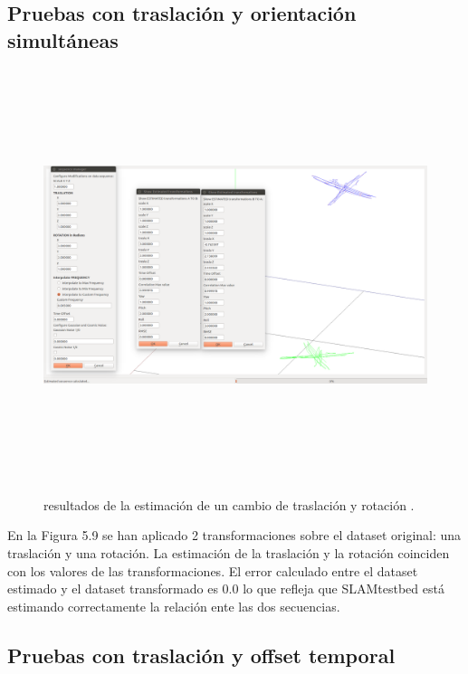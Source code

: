 \subsection{Pruebas con traslación y orientación simultáneas}
\begin{figure}[h]
\begin{center}
\label{fig:opciones de View}\includegraphics[height=12.0cm,width=18.0cm]{img/cap6/Trasla_Rota_abba.png}
\hspace{0.5cm}

\end{center}

\caption{ resultados de la estimación de un cambio de traslación y rotación .}
\end{figure}

En la Figura 5.9 se han aplicado 2 transformaciones sobre el dataset original: una traslación y una rotación.
La estimación de la traslación y la rotación coinciden con los valores de las transformaciones. El error calculado entre el dataset estimado y el dataset transformado es 0.0 lo que refleja que SLAMtestbed está estimando correctamente la relación ente las dos secuencias.

\subsection{Pruebas con traslación y offset temporal}

